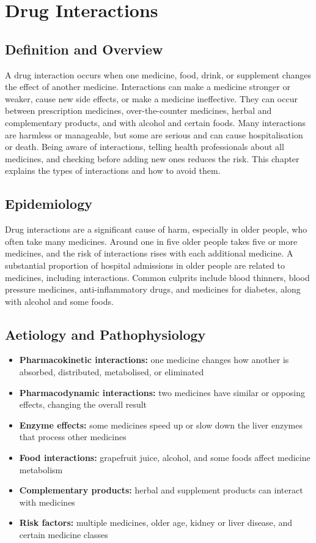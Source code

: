 \chapter{Drug Interactions}

\section*{Definition and Overview}
A drug interaction occurs when one medicine, food, drink, or supplement changes the effect of another medicine. Interactions can make a medicine stronger or weaker, cause new side effects, or make a medicine ineffective. They can occur between prescription medicines, over-the-counter medicines, herbal and complementary products, and with alcohol and certain foods. Many interactions are harmless or manageable, but some are serious and can cause hospitalisation or death. Being aware of interactions, telling health professionals about all medicines, and checking before adding new ones reduces the risk. This chapter explains the types of interactions and how to avoid them.

\section*{Epidemiology}
Drug interactions are a significant cause of harm, especially in older people, who often take many medicines. Around one in five older people takes five or more medicines, and the risk of interactions rises with each additional medicine. A substantial proportion of hospital admissions in older people are related to medicines, including interactions. Common culprits include blood thinners, blood pressure medicines, anti-inflammatory drugs, and medicines for diabetes, along with alcohol and some foods.

\section*{Aetiology and Pathophysiology}
\begin{itemize}
    \item \textbf{Pharmacokinetic interactions:} one medicine changes how another is absorbed, distributed, metabolised, or eliminated
    \item \textbf{Pharmacodynamic interactions:} two medicines have similar or opposing effects, changing the overall result
    \item \textbf{Enzyme effects:} some medicines speed up or slow down the liver enzymes that process other medicines
    \item \textbf{Food interactions:} grapefruit juice, alcohol, and some foods affect medicine metabolism
    \item \textbf{Complementary products:} herbal and supplement products can interact with medicines
    \item \textbf{Risk factors:} multiple medicines, older age, kidney or liver disease, and certain medicine classes
\end{itemize}

